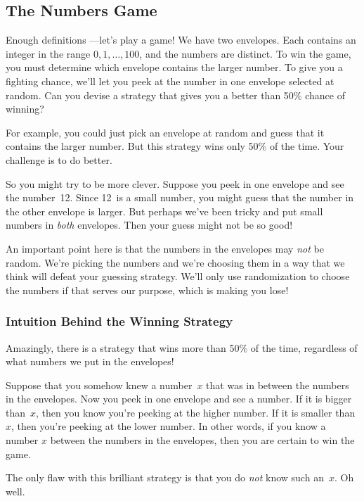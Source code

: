 \subsection{The Numbers Game}\label{bigger_number_subsec}

Enough definitions ---let's play a game!  We have two envelopes.  Each
contains an integer in the range $0, 1, \dots, 100$, and the numbers
are distinct.  To win the game, you must determine which envelope
contains the larger number.  To give you a fighting chance, we'll let
you peek at the number in one envelope selected at random.  Can you
devise a strategy that gives you a better than 50\% chance of winning?

For example, you could just pick an envelope at random and guess that
it contains the larger number.  But this strategy wins only 50\% of
the time.  Your challenge is to do better.

So you might try to be more clever.  Suppose you peek in one envelope
and see the number~12.  Since 12~is a small number, you might guess
that the number in the other envelope is larger.  But perhaps we've
been tricky and put small numbers in \textit{both} envelopes.  Then
your guess might not be so good!

An important point here is that the numbers in the envelopes may
\emph{not} be random.  We're picking the numbers and we're choosing
them in a way that we think will defeat your guessing strategy.  We'll
only use randomization to choose the numbers if that serves our
purpose, which is making you lose!

\subsubsection{Intuition Behind the Winning Strategy}

Amazingly, there is a strategy that wins more than 50\% of the time,
regardless of what numbers we put in the envelopes!

Suppose that you somehow knew a number~$x$ that was in between the
numbers in the envelopes.  Now you peek in one envelope and see a
number.  If it is bigger than~$x$, then you know you're peeking at the
higher number.  If it is smaller than $x$, then you're peeking at the
lower number.  In other words, if you know a number $x$ between the
numbers in the envelopes, then you are certain to win the game.

The only flaw with this brilliant strategy is that you do \emph{not}
know such an~$x$.  Oh well.

